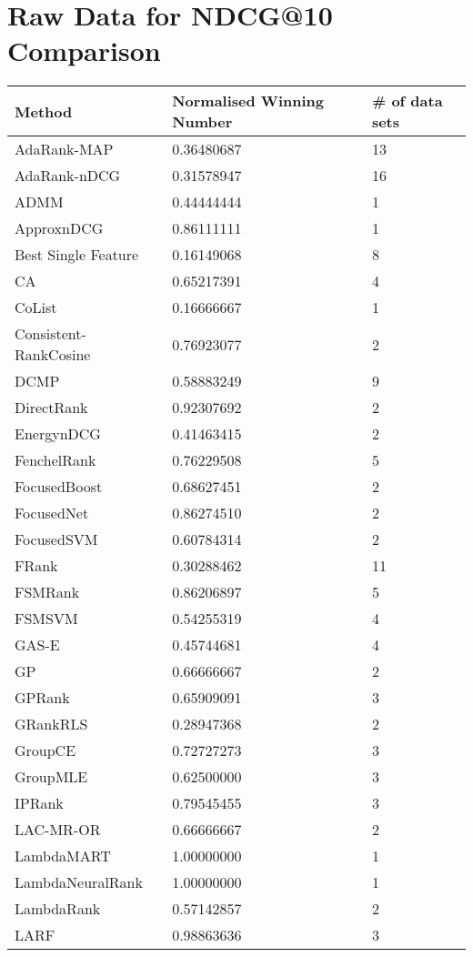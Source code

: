 \chapter{Raw Data for NDCG@10 Comparison}
\label{app:norm_winnum_ndcg10}

\begin{longtable}{l|l|l}
Method & Normalised Winning Number & \# of data sets \\
\hline
AdaRank-\acs{MAP} & 0.36480687 & 13 \\ 
AdaRank-\acs{nDCG} & 0.31578947 & 16 \\ 
\acs{ADMM} & 0.44444444 & 1 \\ 
Approx\acs{nDCG} & 0.86111111 & 1 \\ 
Best Single Feature & 0.16149068 & 8 \\ 
CA & 0.65217391 & 4 \\ 
CoList & 0.16666667 & 1 \\ 
Consistent-RankCosine & 0.76923077 & 2 \\ 
DCMP & 0.58883249 & 9 \\ 
DirectRank & 0.92307692 & 2 \\ 
Energy\acs{nDCG} & 0.41463415 & 2 \\ 
FenchelRank & 0.76229508 & 5 \\ 
FocusedBoost & 0.68627451 & 2 \\ 
FocusedNet & 0.86274510 & 2 \\ 
Focused\acs{SVM} & 0.60784314 & 2 \\ 
FRank & 0.30288462 & 11 \\ 
FSMRank & 0.86206897 & 5 \\ 
FSM\acs{SVM} & 0.54255319 & 4 \\ 
GAS-E & 0.45744681 & 4 \\ 
\acs{GP} & 0.66666667 & 2 \\ 
\acs{GP}Rank & 0.65909091 & 3 \\ 
GRank\acs{RLS} & 0.28947368 & 2 \\ 
GroupCE & 0.72727273 & 3 \\ 
Group\acs{MLE} & 0.62500000 & 3 \\ 
\acs{IP}Rank & 0.79545455 & 3 \\ 
LAC-MR-OR & 0.66666667 & 2 \\ 
LambdaMART & 1.00000000 & 1 \\ 
LambdaNeuralRank & 1.00000000 & 1 \\ 
LambdaRank & 0.57142857 & 2 \\ 
LARF & 0.98863636 & 3 \\ 

\end{longtable}
